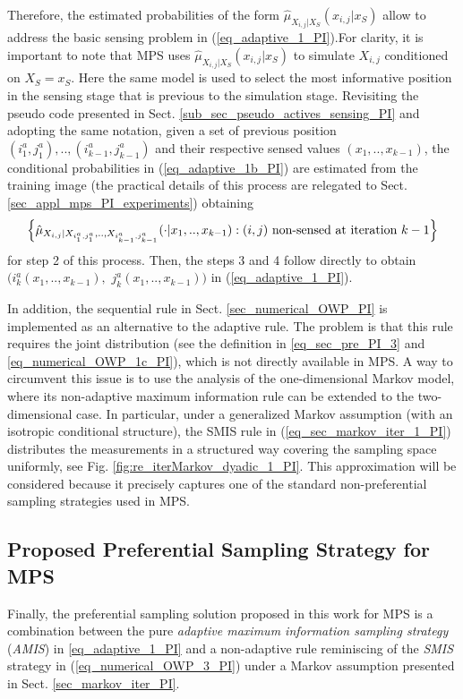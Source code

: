 {
Therefore,  the estimated probabilities of the form $\hat{\mu}_{X_{i,j}| X_S}(x_{i,j}|x_S)$ allow to address the basic sensing problem in (\ref{eq_adaptive_1_PI}).{For clarity, it is important to note that MPS uses $\hat{\mu}_{X_{i,j}|X_S}(x_{i,j}|x_S)$ to simulate $X_{i,j}$ conditioned on $X_S=x_S$. Here the same model is used to select the most informative position in the sensing stage that is previous to the simulation stage.}
Revisiting the pseudo code presented in Sect. \ref{sub_sec_pseudo_actives_sensing_PI} and adopting the same notation, given a set of previous position $(i^a_1,j^a_1),..,(i^a_{k-1},j^a_{k-1})$ and their respective sensed values $(x_1,..,x_{k-1})$,
the conditional probabilities in (\ref{eq_adaptive_1b_PI}) are estimated from the training image (the practical details of this process are relegated to Sect. \ref{sec_appl_mps_PI_experiments}) obtaining
\begin{equation*}
\left\{\hat{\mu}_{X_{i,j}| X_{i^a_1,j^a_1},..,X_{i^a_{k-1},j^a_{k-1}}}(\cdot | x_1,..,x_{k-1}) : (i,j) \textnormal{ non-sensed at iteration } k-1\right\}
\end{equation*}
for step 2 of this process. Then, the steps 3 and 4 follow directly to obtain $(i^a_k(x_1,..,x_{k-1}),$ $j^a_k(x_1,..,x_{k-1}))$
in (\ref{eq_adaptive_1_PI}).
}

{
In addition, the sequential rule in Sect. \ref{sec_numerical_OWP_PI} is implemented as an alternative to the adaptive rule. The problem is that this rule requires the joint distribution (see the definition in \eqref{eq_sec_pre_PI_3} and \eqref{eq_numerical_OWP_1c_PI}), which is not directly available in MPS. A way to circumvent this issue is to use the analysis of the one-dimensional Markov model, where its non-adaptive maximum information rule can be extended to the two-dimensional case. In particular, under a generalized Markov assumption (with an isotropic conditional structure), the SMIS rule in (\ref{eq_sec_markov_iter_1_PI}) distributes the measurements in a structured way covering the sampling space uniformly, see Fig. \ref{fig:re_iterMarkov_dyadic_1_PI}. This approximation will be considered because it precisely captures one of the standard non-preferential sampling strategies used in MPS.
}


\subsection{Proposed Preferential Sampling Strategy for MPS}
\label{subsec_RAMIS_PI}
Finally, the preferential sampling solution proposed in this work for MPS is a combination between the pure \emph{adaptive maximum information sampling strategy} (\emph{AMIS})  in  \eqref{eq_adaptive_1_PI} and a non-adaptive rule reminiscing of the \emph{SMIS} strategy in (\ref{eq_numerical_OWP_3_PI}) under a Markov assumption presented in Sect. \ref{sec_markov_iter_PI}. 


